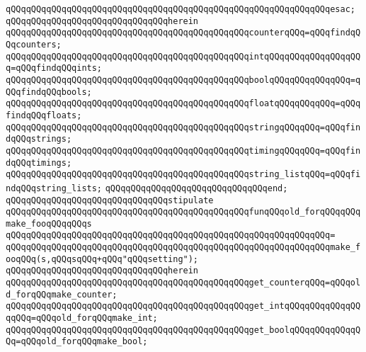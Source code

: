 \verb|qQQqqQQqqQQqqQQqqQQqqQQqqQQqqQQqqQQqqQQqqQQqqQQqqQQqqQQqqQQqqQQqesac;|\newline
\verb|qQQqqQQqqQQqqQQqqQQqqQQqqQQqqQQqherein|\newline
\newline
\verb|qQQqqQQqqQQqqQQqqQQqqQQqqQQqqQQqqQQqqQQqqQQqqQQqcounterqQQq=qQQqfindqQQqcounters;|\newline
\verb|qQQqqQQqqQQqqQQqqQQqqQQqqQQqqQQqqQQqqQQqqQQqqQQqintqQQqqQQqqQQqqQQqqQQq=qQQqfindqQQqints;|\newline
\verb|qQQqqQQqqQQqqQQqqQQqqQQqqQQqqQQqqQQqqQQqqQQqqQQqboolqQQqqQQqqQQqqQQq=qQQqfindqQQqbools;|\newline
\verb|qQQqqQQqqQQqqQQqqQQqqQQqqQQqqQQqqQQqqQQqqQQqqQQqfloatqQQqqQQqqQQq=qQQqfindqQQqfloats;|\newline
\verb|qQQqqQQqqQQqqQQqqQQqqQQqqQQqqQQqqQQqqQQqqQQqqQQqstringqQQqqQQq=qQQqfindqQQqstrings;|\newline
\verb|qQQqqQQqqQQqqQQqqQQqqQQqqQQqqQQqqQQqqQQqqQQqqQQqtimingqQQqqQQq=qQQqfindqQQqtimings;|\newline
\newline
\verb|qQQqqQQqqQQqqQQqqQQqqQQqqQQqqQQqqQQqqQQqqQQqqQQqstring_listqQQq=qQQqfindqQQqstring_lists;|\newline
\verb|qQQqqQQqqQQqqQQqqQQqqQQqqQQqqQQqend;|\newline
\newline
\newline
\verb|qQQqqQQqqQQqqQQqqQQqqQQqqQQqqQQqstipulate|\newline
\verb|qQQqqQQqqQQqqQQqqQQqqQQqqQQqqQQqqQQqqQQqqQQqqQQqfunqQQqold_forqQQqqQQqmake_fooqQQqqQQqs|\newline
\verb|qQQqqQQqqQQqqQQqqQQqqQQqqQQqqQQqqQQqqQQqqQQqqQQqqQQqqQQqqQQqqQQq=|\newline
\verb|qQQqqQQqqQQqqQQqqQQqqQQqqQQqqQQqqQQqqQQqqQQqqQQqqQQqqQQqqQQqqQQqmake_fooqQQq(s,qQQqsqQQq+qQQq"qQQqsetting");|\newline
\verb|qQQqqQQqqQQqqQQqqQQqqQQqqQQqqQQqherein|\newline
\newline
\verb|qQQqqQQqqQQqqQQqqQQqqQQqqQQqqQQqqQQqqQQqqQQqqQQqget_counterqQQq=qQQqold_forqQQqmake_counter;|\newline
\verb|qQQqqQQqqQQqqQQqqQQqqQQqqQQqqQQqqQQqqQQqqQQqqQQqget_intqQQqqQQqqQQqqQQqqQQq=qQQqold_forqQQqmake_int;|\newline
\verb|qQQqqQQqqQQqqQQqqQQqqQQqqQQqqQQqqQQqqQQqqQQqqQQqget_boolqQQqqQQqqQQqqQQq=qQQqold_forqQQqmake_bool;|\newline
